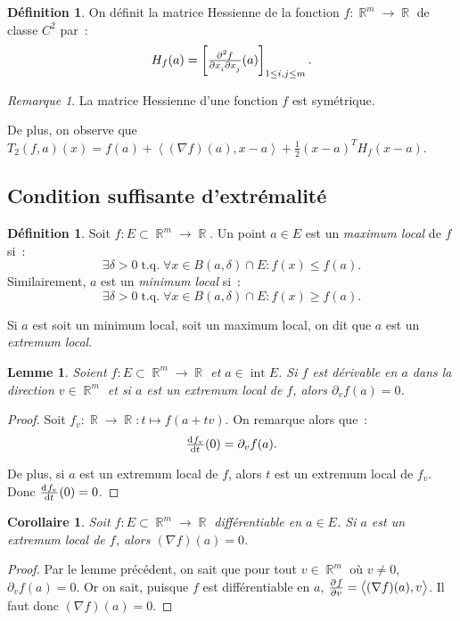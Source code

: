\documentclass{article}
\DeclareMathOperator{\intr}{int}
\DeclareMathOperator{\R}{\mathbb R}
\DeclareMathOperator{\tq}{ t.q. }
\newcommand{\scpr}[2]{{\left\langle#1, #2\right\rangle}}
\newtheorem{cor}[thm]{Corollaire}
\newtheorem{lem}[thm]{Lemme}
\theoremstyle{definition}
\newtheorem{déf}[thm]{Définition}
\theoremstyle{remark}
\newtheorem*{rmq}{Remarque}
\begin{document}
		\begin{déf} On définit la matrice Hessienne de la fonction $f : \R^m \to \R$ de classe $C^2$ par~:
		\[H_f(a) = \left[\md f2{x_i}{}{x_j}{}(a)\right]_{1 \leq i, j \leq m}.\]
		\end{déf}

		\begin{rmq} La matrice Hessienne d'une fonction $f$ est symétrique.

		De plus, on observe que $T_2(f, a)(x) = f(a) + \scpr {(\nabla f)(a)}{x-a} + \frac 12(x-a)^TH_f(x-a)$.
		\end{rmq}

	\subsection{Condition suffisante d’extrémalité}
		\begin{déf} Soit $f : E \subset \R^m \to \R$. Un point $a \in E$ est un \emph{maximum local} de $f$ si~:
		\[\exists \delta > 0 \tq \forall x \in B(a, \delta) \cap E : f(x) \leq f(a).\]
		Similairement, $a$ est un \emph{minimum local} si~:
		\[\exists \delta > 0 \tq \forall x \in B(a, \delta) \cap E : f(x) \geq f(a).\]

		Si $a$ est soit un minimum local, soit un maximum local, on dit que $a$ est un \emph{extremum local}.
		\end{déf}

		\begin{lem} Soient $f : E \subset \R^m \to \R$ et $a \in \intr E$. Si $f$ est dérivable en $a$ dans la direction $v \in \R^m$ et si $a$ est un extremum
		local de $f$, alors $\partial_v f(a) = 0$.
		\end{lem}

		\begin{proof} Soit $f_v : \R \to \R : t \mapsto f(a + tv)$. On remarque alors que~:
		\[\od {f_v}t(0) = \partial_v f(a).\]

		De plus, si $a$ est un extremum local de $f$, alors $t$ est un extremum local de $f_v$. Donc $\od {f_v}t(0) = 0$.
		\end{proof}

		\begin{cor} Soit $f : E \subset \R^m \to \R$ différentiable en $a \in E$. Si $a$ est un extremum local de $f$, alors $(\nabla f)(a) = 0$.
		\end{cor}

		\begin{proof} Par le lemme précédent, on sait que pour tout $v \in \R^m$ où $v \neq 0$, $\partial_v f(a) = 0$. Or on sait, puisque $f$ est différentiable
		en $a$, $\pd fv = \scpr {(\nabla f)(a)}v$. Il faut donc $(\nabla f)(a) = 0$.
		\end{proof}
\end{document}
